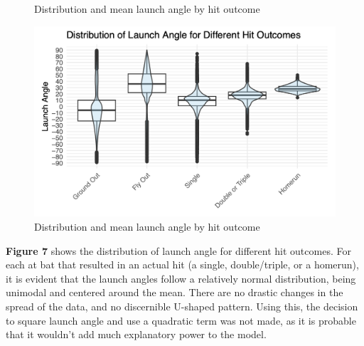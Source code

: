 \documentclass[
  letterpaper,
  DIV=11,
  numbers=noendperiod]{scrartcl}
\begin{document}
\begin{figure}[H]


\caption{\label{fig-la-dist}Distribution and mean launch angle by hit
outcome}

\end{figure}%

\begin{figure}[H]

{\centering \includegraphics{./images/figures/fig7.png}

}

\caption{Distribution and mean launch angle by hit outcome}

\end{figure}%

\textbf{Figure 7} shows the distribution of launch angle for different
hit outcomes. For each at bat that resulted in an actual hit (a single,
double/triple, or a homerun), it is evident that the launch angles
follow a relatively normal distribution, being unimodal and centered
around the mean. There are no drastic changes in the spread of the data,
and no discernible U-shaped pattern. Using this, the decision to square
launch angle and use a quadratic term was not made, as it is probable
that it wouldn't add much explanatory power to the model.
\end{document}
